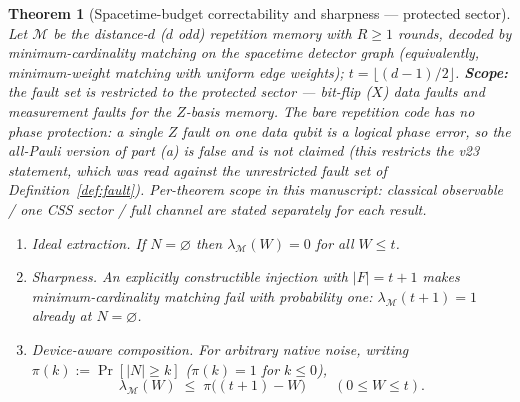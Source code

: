 \documentclass[11pt,a4paper]{article}
\newtheorem{theorem}{Theorem}\newtheorem{lemma}{Lemma}
\begin{document}
\begin{theorem}[Spacetime-budget correctability and sharpness --- protected sector]
\label{thm:spacetime}
Let $\mathcal{M}$ be the distance-$d$ ($d$ odd) repetition memory with
$R\ge1$ rounds, decoded by \emph{minimum-cardinality} matching on the
spacetime detector graph (equivalently, minimum-weight matching with
uniform edge weights); $t=\lfloor(d-1)/2\rfloor$. \textbf{Scope:} the fault
set is restricted to the \emph{protected sector} --- bit-flip ($X$)
data faults and measurement faults for the $Z$-basis memory. The
bare repetition code has no phase protection: a single $Z$ fault on
one data qubit is a logical phase error, so the all-Pauli version of
part (a) is false and is not claimed (this restricts the v23 statement,
which was read against the unrestricted fault set of
Definition~\ref{def:fault}). Per-theorem scope in this manuscript:
classical observable / one CSS sector / full channel are stated
separately for each result.
\begin{enumerate}[label=(\alph*),leftmargin=1.6em]
\item \emph{Ideal extraction.} If $N=\varnothing$ then
$\lambda_{\mathcal{M}}(W)=0$ for all $W\le t$.
\item \emph{Sharpness.} An explicitly constructible injection with
$|F|=t+1$ makes minimum-cardinality matching fail with probability one:
$\lambda_{\mathcal{M}}(t+1)=1$ already at $N=\varnothing$.
\item \emph{Device-aware composition.} For arbitrary native noise,
writing $\pi(k):=\Pr[|N|\ge k]$ ($\pi(k)=1$ for $k\le0$),
\[
\lambda_{\mathcal{M}}(W)\;\le\;\pi\bigl((t{+}1)-W\bigr)\qquad(0\le W\le t).
\]
\end{enumerate}
\end{theorem}
\end{document}

